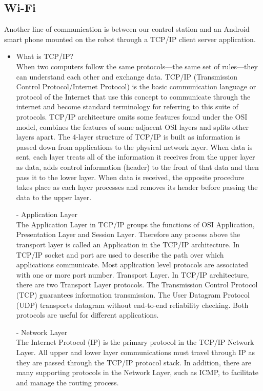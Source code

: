	\subsection{Wi-Fi}
		Another line of communication is between our control station and an Android smart phone mounted on the robot through a TCP/IP client server application.
		\begin{itemize}
			\item What is TCP/IP?\\
			When two computers follow the same protocols—the same set of rules—they can understand each other and exchange data. TCP/IP (Transmission Control Protocol/Internet Protocol) is the basic communication language or protocol of the Internet that use this concept to communicate through the internet and become standard terminology for referring to this suite of protocols.		
			TCP/IP architecture omits some features found under the OSI model, combines the features of some adjacent OSI layers and splits other layers apart. The 4-layer structure of TCP/IP is built as information is passed down from applications to the physical network layer. When data is sent, each layer treats all of the information it receives from the upper layer as data, adds control information (header) to the front of that data and then pass it to the lower layer. When data is received, the opposite procedure takes place as each layer processes and removes its header before passing the data to the upper layer. 
			
			- Application Layer\\
			The Application Layer in TCP/IP groups the functions of OSI Application, Presentation Layer and Session Layer. Therefore any process above the transport layer is called an Application in the TCP/IP architecture. In TCP/IP socket and port are used to describe the path over which applications communicate. Most application level protocols are associated with one or more port number.
			Transport Layer. In TCP/IP architecture, there are two Transport Layer protocols. The Transmission Control Protocol (TCP) guarantees information transmission. The User Datagram Protocol (UDP) transports datagram without end-to-end reliability checking. Both protocols are useful for different applications.
			
			- Network Layer\\
			The Internet Protocol (IP) is the primary protocol in the TCP/IP Network Layer. All upper and lower layer communications must travel through IP as they are passed through the TCP/IP protocol stack. In addition, there are many supporting protocols in the Network Layer, such as ICMP, to facilitate and manage the routing process.
			

\end{itemize}
